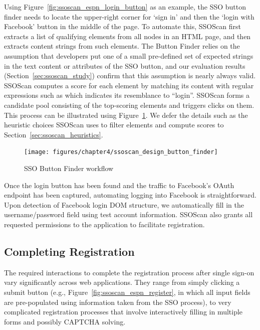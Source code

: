 Using Figure~\ref{fig:ssoscan_espn_login_button} as an example, the SSO button finder needs to locate the upper-right corner for `sign in' and then the `login with Facebook' button in the middle of the page.  To automate this, SSOScan first extracts a list of qualifying elements from all nodes in an HTML page, and then extracts content strings from such elements.  The Button Finder relies on the assumption that developers put one of a small pre-defined set of expected strings in the text content or attributes of the SSO button, and our evaluation results (Section~\ref{sec:ssoscan_study}) confirm that this assumption is nearly always valid.  SSOScan computes a score for each element by matching its content with regular expressions such as \code{[Ll][Oo][Gg][IiOo][Nn]} which indicates its resemblance to ``login''.  SSOScan forms a candidate pool consisting of the top-scoring elements and triggers clicks on them.  This process can be illustrated using Figure~\ref{fig:ssoscan_design_button_finder}.  We defer the details such as the heuristic choices SSOScan uses to filter elements and compute scores to Section~\ref{sec:ssoscan_heuristics}.

\begin{figure}[hbt]
\centering
\texttt{[image: figures/chapter4/ssoscan\_design\_button\_finder]}
\caption{SSO Button Finder workflow}
\label{fig:ssoscan_design_button_finder}
\end{figure}

Once the login button has been found and the traffic to Facebook's OAuth endpoint has been captured, automating logging into Facebook is straightforward.  Upon detection of Facebook login DOM structure, we automatically fill in the username/password field using test account information.  SSOScan also grants all requested permissions to the application to facilitate registration.

\subsection{Completing Registration}
\label{sec:ssoscan_design_cr}

The required interactions to complete the registration process after single sign-on vary significantly across web applications.  They range from simply clicking a submit button (e.g., Figure~\ref{fig:ssoscan_espn_register}, in which all input fields are pre-populated using information taken from the SSO process), to very complicated registration processes that involve interactively filling in multiple forms and possibly CAPTCHA solving.


